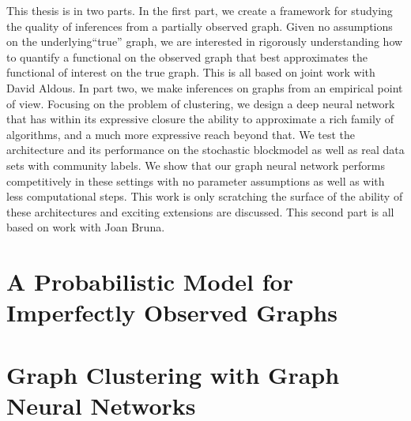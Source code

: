 \documentclass{ucbthesis}
\theoremstyle{definition}
\theoremstyle{remark}
\begin{document}
This thesis is in two parts.  In the first part, we create a framework for studying the quality of inferences from a partially observed graph.  Given no assumptions on the underlying``true'' graph, we are interested in rigorously understanding how to quantify a functional on the observed graph that best approximates the functional of interest on the true graph. This is all based on joint work with David Aldous.  In part two, we make inferences on graphs from an empirical point of view.  Focusing on the problem of clustering, we design a deep neural network that has within its expressive closure the ability to approximate a rich family of algorithms, and a much more expressive reach beyond that.  We test the architecture and its performance on the stochastic blockmodel as well as real data sets with community labels.  We show that our graph neural network performs competitively in these settings with no parameter assumptions as well as with less computational steps. This work is only scratching the surface of the ability of these architectures and exciting extensions are discussed.  This second part is all based on work with Joan Bruna. 

\part{A Probabilistic Model for Imperfectly Observed Graphs}







\part{Graph Clustering with Graph Neural Networks}





%

\appendix
\printbibliography
\end{document}
